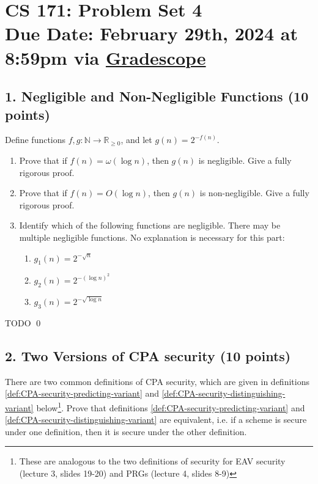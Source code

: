\documentclass[11pt]{article}
\newenvironment{solution}{\noindent{\bf Solution}\hspace*{1em}}{\qed\medskip}
\newcommand{\duedate}{February 29th, 2024 at 8:59pm via \href{https://www.gradescope.com/courses/689970}{Gradescope}}
\begin{document}
\section*{CS 171: Problem Set 4\\ {\small Due Date: \duedate} }

\subsection*{1. Negligible and Non-Negligible Functions (10 points)}
Define functions $f,g: \mathbb{N} \to \mathbb{R}_{\geq 0}$, and let $g(n) = 2^{-f(n)}$.

\begin{enumerate}
    \item Prove that if $f(n) = \omega(\log n)$, then $g(n)$ is negligible. Give a fully rigorous proof.
    \item Prove that if $f(n) = O(\log n)$, then $g(n)$ is non-negligible. Give a fully rigorous proof.
    \item Identify which of the following functions are negligible. There may be multiple negligible functions. No explanation is necessary for this part:
    \begin{enumerate}
        \item $g_1(n) = 2^{-\sqrt{n}}$
        \item $g_2(n) = 2^{-(\log n)^{2}}$
        \item $g_3(n) = 2^{-\sqrt{\log n}}$
    \end{enumerate}
\end{enumerate}

\begin{solution}
    TODO
\end{solution}
\pagebreak

\subsection*{2. Two Versions of CPA security (10 points)}
There are two common definitions of CPA security, which are given in definitions \ref{def:CPA-security-predicting-variant} and \ref{def:CPA-security-distinguishing-variant} below\footnote{These are analogous to the two definitions of security for EAV security (lecture 3, slides 19-20) and PRGs (lecture 4, slides 8-9)}. Prove that definitions \ref{def:CPA-security-predicting-variant} and \ref{def:CPA-security-distinguishing-variant} are equivalent, i.e. if a scheme is secure under one definition, then it is secure under the other definition. 
\end{document}
